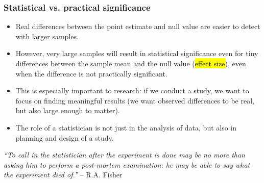 
\begin{frame}
\frametitle{Statistical vs. practical significance}

\begin{itemize}

\item Real differences between the point estimate and null value are easier to detect with larger samples.

\item However, very large samples will result in statistical significance even for tiny differences between the sample mean and the null value (\hl{effect size}), even when the difference is not practically significant.

\item This is especially important to research: if we conduct a study, we want to focus on finding meaningful results (we want observed differences to be real, but also large enough to matter).

\item The role of a statistician is not just in the analysis of data, but also in planning and design of a study.
\end{itemize}

\begin{center}{\footnotesize
\textit{``To call in the statistician after the experiment is done may be no more than asking him to perform a post-mortem examination: he may be able to say what the experiment died of.''} -- R.A. Fisher
}\end{center}

\end{frame}

